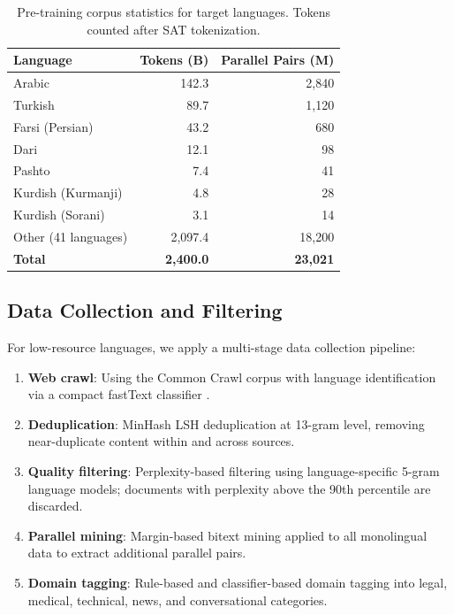 \documentclass[11pt,twocolumn]{article}
\begin{document}
\begin{table}[h]
\centering
\caption{Pre-training corpus statistics for target languages. Tokens counted
after SAT tokenization.}
\label{tab:pretraining_data}
\begin{tabular}{lrr}
\toprule
\textbf{Language} & \textbf{Tokens (B)} & \textbf{Parallel Pairs (M)} \\
\midrule
Arabic & 142.3 & 2,840 \\
Turkish & 89.7 & 1,120 \\
Farsi (Persian) & 43.2 & 680 \\
Dari & 12.1 & 98 \\
Pashto & 7.4 & 41 \\
Kurdish (Kurmanji) & 4.8 & 28 \\
Kurdish (Sorani) & 3.1 & 14 \\
Other (41 languages) & 2,097.4 & 18,200 \\
\midrule
\textbf{Total} & \textbf{2,400.0} & \textbf{23,021} \\
\bottomrule
\end{tabular}
\end{table}

\subsection{Data Collection and Filtering}

For low-resource languages, we apply a multi-stage data collection pipeline:
\begin{enumerate}[leftmargin=*,noitemsep]
  \item \textbf{Web crawl}: Using the Common Crawl corpus with language
        identification via a compact fastText classifier \citep{joulin2016fasttext}.
  \item \textbf{Deduplication}: MinHash LSH deduplication at 13-gram level,
        removing near-duplicate content within and across sources.
  \item \textbf{Quality filtering}: Perplexity-based filtering using
        language-specific 5-gram language models; documents with perplexity
        above the 90th percentile are discarded.
  \item \textbf{Parallel mining}: Margin-based bitext mining \citep{artetxe2019massively}
        applied to all monolingual data to extract additional parallel pairs.
  \item \textbf{Domain tagging}: Rule-based and classifier-based domain tagging
        into legal, medical, technical, news, and conversational categories.
\end{enumerate}
\end{document}
